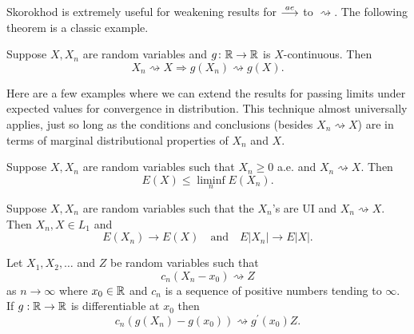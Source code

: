 Skorokhod is extremely useful for weakening results for $\overset{\small ae} \longrightarrow$ to $\rightsquigarrow$.
The following theorem is a classic example.

\begin{theorem}
Suppose $X, X_n$ are random variables and  $g\colon\Bbb R\rightarrow\Bbb R$ is $X$-continuous. Then
\[X_n \rightsquigarrow X \Longrightarrow g(X_n) \rightsquigarrow g(X).  \]
\end{theorem}

Here are a few examples where we can extend the results for passing limits under expected values for convergence in distribution. This technique almost universally applies, just so long as the conditions and conclusions (besides $X_n\rightsquigarrow X$) are in terms of marginal distributional properties of $X_n$ and $X$.

\begin{theorem}[{\bf Fatou}]
Suppose $X, X_n$ are random variables such that  $X_n\geq 0$ a.e. and $X_n\rightsquigarrow X$. Then
\[
E(X)\leq \liminf_n E(X_n).
\]
\end{theorem}



\begin{theorem}[{\bf UI}]
Suppose $X, X_n$ are random variables  such that the $X_n$'s  are UI and $X_n\rightsquigarrow X$. Then $X_n, X\in L_1$ and 
\[
E(X_n)\rightarrow E(X)\quad\text{and}\quad E|X_n|\rightarrow E|X|. 
\]
\end{theorem}



\begin{theorem}
Let $X_1, X_2, \ldots$ and $Z$ be random variables such that 
\[c_n(X_n - x_0) \rightsquigarrow Z  \]
as $n\rightarrow \infty$ where $x_0\in \Bbb R$ and $c_n$ is a sequence of positive numbers tending to $\infty$. If $g:\Bbb R \rightarrow \Bbb R $ is differentiable at $x_0$ then 
\[ c_n(g(X_n) - g(x_0)) \rightsquigarrow g^\prime(x_0)Z.  \]
\end{theorem}








